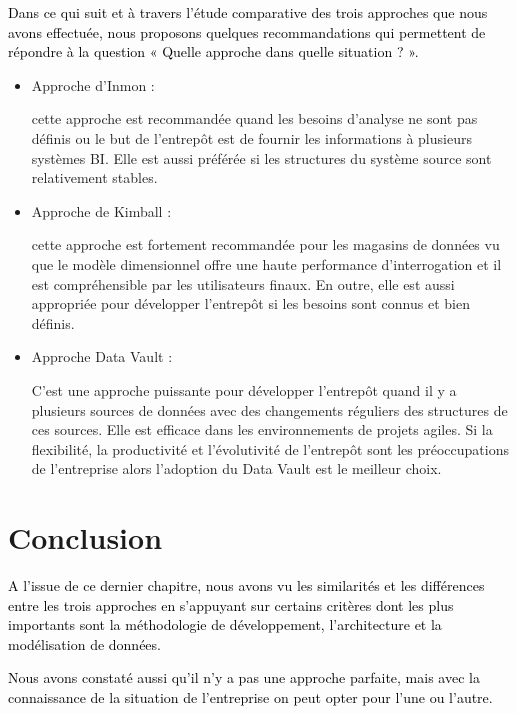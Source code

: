 \documentclass[a4paper,12pt]{report}
\begin{document}
\textcolor{black}{Dans ce qui suit et à travers l’étude comparative des trois approches que nous avons effectuée, nous proposons quelques recommandations qui permettent de répondre à la question « Quelle approche dans quelle situation ? ».} 
\\
\begin{itemize}
	\item  \begin{bf}Approche d’Inmon :\end{bf}cette approche est recommandée quand les besoins d’analyse ne sont pas définis ou le but de l’entrepôt est de fournir les informations à plusieurs systèmes BI. Elle est aussi préférée si les structures du système source sont relativement stables.
	\item  \begin{bf}Approche de Kimball :\end{bf}cette approche est fortement recommandée pour les magasins de données vu que le modèle dimensionnel offre une haute performance d’interrogation et il est compréhensible par les utilisateurs finaux. En outre, elle est aussi appropriée pour développer l’entrepôt si les besoins sont connus et bien définis.
	\item  \begin{bf}Approche Data Vault :\end{bf}C’est une approche puissante pour développer l’entrepôt  quand il y a plusieurs sources de données avec des changements réguliers des structures de ces sources. Elle est efficace dans les environnements de projets agiles. Si la flexibilité, la productivité et l’évolutivité de l’entrepôt sont les préoccupations de l’entreprise alors l’adoption du Data Vault est le meilleur choix.
\end{itemize}


\section*{Conclusion}
\textcolor{black}{A l’issue de ce dernier chapitre, nous avons vu les similarités et les différences entre les trois approches en s’appuyant sur certains critères dont les plus importants  sont la méthodologie de développement, l’architecture et la modélisation de données.}  

\textcolor{black}{Nous avons constaté aussi qu’il n’y a pas une approche parfaite, mais avec la connaissance de la situation de l’entreprise on peut opter pour l’une ou l’autre.}\\
\end{document}
